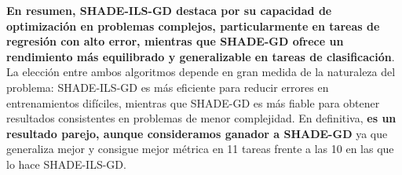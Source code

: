 \textbf{En resumen, SHADE-ILS-GD destaca por su capacidad de optimización en problemas complejos, particularmente en tareas de regresión con alto error, mientras que SHADE-GD ofrece un rendimiento más equilibrado y generalizable en tareas de clasificación}. La elección entre ambos algoritmos depende en gran medida de la naturaleza del problema: SHADE-ILS-GD es más eficiente para reducir errores en entrenamientos difíciles, mientras que SHADE-GD es más fiable para obtener resultados consistentes en problemas de menor complejidad. En definitiva,\textbf{ es un resultado parejo, aunque consideramos ganador a SHADE-GD} ya que generaliza mejor y consigue mejor métrica en 11 tareas frente a las 10 en las que lo hace SHADE-ILS-GD.